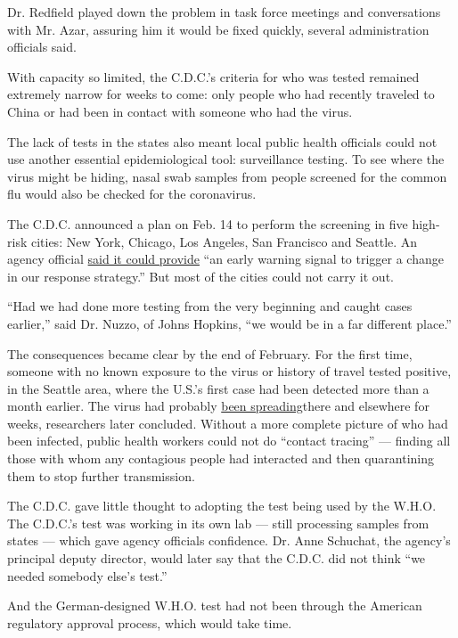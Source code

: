 Dr. Redfield played down the problem in task force meetings and
conversations with Mr. Azar, assuring him it would be fixed quickly,
several administration officials said.

With capacity so limited, the C.D.C.'s criteria for who was tested
remained extremely narrow for weeks to come: only people who had
recently traveled to China or had been in contact with someone who had
the virus.

The lack of tests in the states also meant local public health officials
could not use another essential epidemiological tool: surveillance
testing. To see where the virus might be hiding, nasal swab samples from
people screened for the common flu would also be checked for the
coronavirus.

The C.D.C. announced a plan on Feb. 14 to perform the screening in five
high-risk cities: New York, Chicago, Los Angeles, San Francisco and
Seattle. An agency official
\href{https://www.cdc.gov/media/releases/2020/t0214-covid-19-update.html.html}{said
it could provide} ``an early warning signal to trigger a change in our
response strategy.'' But most of the cities could not carry it out.

``Had we had done more testing from the very beginning and caught cases
earlier,'' said Dr. Nuzzo, of Johns Hopkins, ``we would be in a far
different place.''

The consequences became clear by the end of February. For the first
time, someone with no known exposure to the virus or history of travel
tested positive, in the Seattle area, where the U.S.'s first case had
been detected more than a month earlier. The virus had probably
\href{https://www.nytimes3xbfgragh.onion/2020/03/10/us/coronavirus-testing-delays.html}{been
spreading}there and elsewhere for weeks, researchers later concluded.
Without a more complete picture of who had been infected, public health
workers could not do ``contact tracing'' --- finding all those with whom
any contagious people had interacted and then quarantining them to stop
further transmission.

The C.D.C. gave little thought to adopting the test being used by the
W.H.O. The C.D.C.'s test was working in its own lab --- still processing
samples from states --- which gave agency officials confidence. Dr. Anne
Schuchat, the agency's principal deputy director, would later say that
the C.D.C. did not think ``we needed somebody else's test.''

And the German-designed W.H.O. test had not been through the American
regulatory approval process, which would take time.

